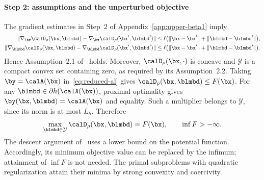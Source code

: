 \paragraph{Step 2: assumptions and the unperturbed objective}
The gradient estimates in Step~2 of Appendix~\ref{app:upper-beta1} imply
\[
\begin{aligned}
\|\nabla_{\bx}\calD_\rho(\bx,\blmbd)
-\nabla_{\bx}\calD_\rho(\bx',\blmbd')\|
&\le\ell\bigl(\|\bx-\bx'\|+\|\blmbd-\blmbd'\|\bigr),\\
\|\nabla_{\blmbd}\calD_\rho(\bx,\blmbd)
-\nabla_{\blmbd}\calD_\rho(\bx',\blmbd')\|
&\le\ell\bigl(\|\bx-\bx'\|+\|\blmbd-\blmbd'\|\bigr).
\end{aligned}
\]
Hence Assumption~2.1 of~\cite{li2026smoothing} holds. Moreover,
\(\calD_\rho(\bx,\cdot)\) is concave and \(\mathcal Y\) is a compact
convex set containing zero, as required by its Assumption~2.2.
Taking \(\by=\calA(\bx)\) in~\eqref{eq:reduced-al} gives
\(\calD_\rho(\bx,\blmbd)\le F(\bx)\). For any
\(\blmbd\in\partial h(\calA(\bx))\), proximal optimality gives
\(\by(\bx,\blmbd)=\calA(\bx)\) and equality. Such a multiplier belongs
to \(\mathcal Y\), since its norm is at most \(L_h\). Therefore
\[
\max_{\blmbd\in\mathcal Y}\calD_\rho(\bx,\blmbd)=F(\bx),
\qquad \inf F>-\infty.
\]
The descent argument of~\cite[Section~4.2]{li2026smoothing} uses a lower
bound on the potential function. Accordingly, its minimum objective value
can be replaced by the infimum; attainment of \(\inf F\) is not needed.
The primal subproblems with quadratic regularization attain their minima
by strong convexity and coercivity.

